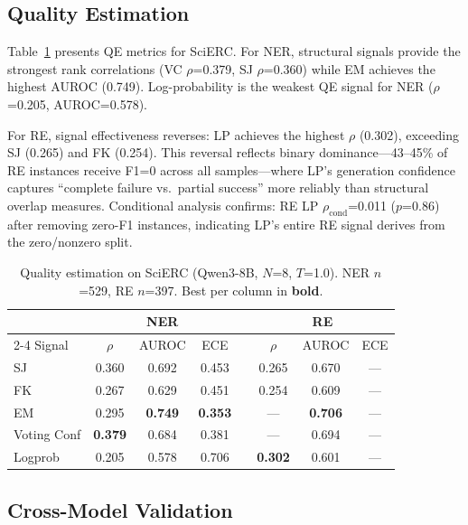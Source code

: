 \documentclass[11pt,a4paper]{article}
\begin{document}
\subsection{Quality Estimation}
\label{sec:qe}

Table~\ref{tab:qe_scierc} presents QE metrics for SciERC.
For NER, structural signals provide the strongest rank correlations (VC $\rho$=0.379, SJ $\rho$=0.360) while EM achieves the highest AUROC (0.749).
Log-probability is the weakest QE signal for NER ($\rho$=0.205, AUROC=0.578).

For RE, signal effectiveness reverses: LP achieves the highest $\rho$ (0.302), exceeding SJ (0.265) and FK (0.254).
This reversal reflects binary dominance---43--45\% of RE instances receive F1=0 across all samples---where LP's generation confidence captures ``complete failure vs.\ partial success'' more reliably than structural overlap measures.
Conditional analysis confirms: RE LP $\rho_{\text{cond}}$=0.011 ($p$=0.86) after removing zero-F1 instances, indicating LP's entire RE signal derives from the zero/nonzero split.

\begin{table}[t]
\centering
\small
\caption{Quality estimation on SciERC (Qwen3-8B, $N$=8, $T$=1.0). NER $n$=529, RE $n$=397. Best per column in \textbf{bold}.}
\label{tab:qe_scierc}
\begin{tabular}{@{}l ccc c ccc@{}}
\toprule
& \multicolumn{3}{c}{\textbf{NER}} && \multicolumn{3}{c}{\textbf{RE}} \\
\cmidrule{2-4} \cmidrule{6-8}
Signal & $\rho$ & AUROC & ECE && $\rho$ & AUROC & ECE \\
\midrule
SJ & 0.360 & 0.692 & 0.453 && 0.265 & 0.670 & --- \\
FK & 0.267 & 0.629 & 0.451 && 0.254 & 0.609 & --- \\
EM & 0.295 & \textbf{0.749} & \textbf{0.353} && --- & \textbf{0.706} & --- \\
Voting Conf & \textbf{0.379} & 0.684 & 0.381 && --- & 0.694 & --- \\
Logprob & 0.205 & 0.578 & 0.706 && \textbf{0.302} & 0.601 & --- \\
\bottomrule
\end{tabular}
\end{table}

\subsection{Cross-Model Validation}
\label{sec:crossmodel}
\end{document}
